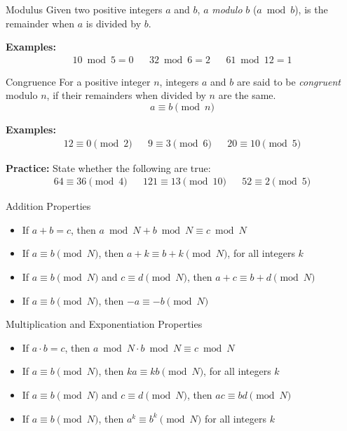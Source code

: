 \documentclass{beamer}
\begin{document}
\begin{frame}{Modulus}
    Given two positive integers $a$ and $b$, $a$ \textit{modulo} $b$ ($a \bmod b$), is the remainder when $a$ is divided by $b$. \newline

    \textbf{Examples:}
    \begin{align*}
        10 \bmod 5 = 0 && 32 \bmod 6 = 2 && 61 \bmod 12 = 1
    \end{align*}
\end{frame}

\begin{frame}{Congruence}
    For a positive integer $n$, integers $a$ and $b$ are said to be \textit{congruent} modulo $n$, if their remainders when divided by $n$ are the same. $$a \equiv b \pmod n$$
    
    \textbf{Examples:}
    \begin{align*}
        12 \equiv 0 \pmod 2 && 9 \equiv 3 \pmod 6 && 20 \equiv 10 \pmod 5
    \end{align*}
    
    \textbf{Practice:} State whether the following are true:
    \begin{align*}
        64 \equiv 36 \pmod 4 && 121 \equiv 13 \pmod {10} && 52 \equiv 2 \pmod 5
    \end{align*}
\end{frame}

\begin{frame}{Addition Properties}
    \begin{itemize}
        \item If $a + b = c$, then $a \bmod N + b \bmod N \equiv c \bmod N$
        \item If $a \equiv b \pmod N$, then $a + k \equiv b + k \pmod N$, for all integers $k$
        \item If $a \equiv b \pmod N$ and $c \equiv d \pmod N$, then $a + c \equiv b + d \pmod N$
        \item If $a \equiv b \pmod N$, then $-a \equiv -b \pmod N$
    \end{itemize}
\end{frame}

\begin{frame}{Multiplication and Exponentiation Properties}
    \begin{itemize}
        \item If $a \cdot b = c$, then $a \bmod N \cdot b \bmod N \equiv c \bmod N$
        \item If $a \equiv b \pmod N$, then $ka \equiv kb \pmod N$, for all integers $k$
        \item If $a \equiv b \pmod N$ and $c \equiv d \pmod N$, then $ac \equiv bd \pmod N$
        \item If $a \equiv b \pmod N$, then $a^k \equiv b^k \pmod N$ for all integers $k$
    \end{itemize}
\end{frame}
\end{document}
